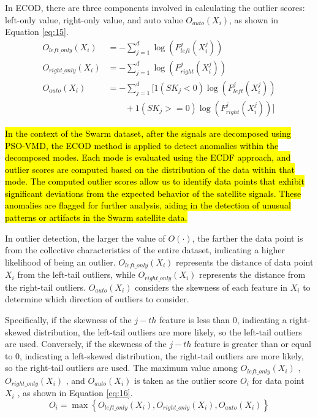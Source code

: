 \documentclass[3p,authoryear,preprint,12pt]{elsarticle}
\begin{document}
In ECOD, there are three components involved in calculating the outlier scores: left-only value, right-only value, and auto value $O_{auto}(X_i)$, as shown in Equation \ref{eq:15}.
\begin{equation}
	\label{eq:15}
	\begin{split}
		O_{left\_only}(X_i) &= - \sum_{j=1}^{d} \log \left( F_{left}^j\left( X_i^j \right) \right) \\
		O_{right\_only}(X_i) &= - \sum_{j=1}^{d} \log \left( F_{right}^j \left( X_i^j \right) \right) \\
		O_{auto}(X_i) &= - \sum_{j=1}^{d} [ 1( SK_j < 0 )\log (F_{left}^j(X_i^j)) \\ & \quad \quad + 1( SK_j >= 0 ) \log (F_{right}^j(X_i^j))]  
	\end{split}
\end{equation}

\hl{In the context of the Swarm dataset, after the signals are decomposed using PSO-VMD, the ECOD method is applied to detect anomalies within the decomposed modes. Each mode is evaluated using the ECDF approach, and outlier scores are computed based on the distribution of the data within that mode. The computed outlier scores allow us to identify data points that exhibit significant deviations from the expected behavior of the satellite signals. These anomalies are flagged for further analysis, aiding in the detection of unusual patterns or artifacts in the Swarm satellite data.}

In outlier detection, the larger the value of $O(\cdot)$, the farther the data point is from the collective characteristics of the entire dataset, indicating a higher likelihood of being an outlier. $O_{left\_only}(X_i)$ represents the distance of data point $X_i$  from the left-tail outliers, while $O_{right\_only}(X_i)$  represents the distance from the right-tail outliers. $O_{auto}(X_i)$ considers the skewness of each feature in $X_i$  to determine which direction of outliers to consider. 

Specifically, if the skewness of the  $j-th$ feature is less than 0, indicating a right-skewed distribution, the left-tail outliers are more likely, so the left-tail outliers are used. Conversely, if the skewness of the  $j-th$ feature is greater than or equal to 0, indicating a left-skewed distribution, the right-tail outliers are more likely, so the right-tail outliers are used. The maximum value among $O_{left\_only}(X_i)$ , $O_{right\_only}(X_i)$ , and $O_{auto}(X_i)$  is taken as the outlier score $O_i$  for data point $X_i$ , as shown in Equation \ref{eq:16}.
\begin{equation}
	\label{eq:16}
	O_i = \max \left\lbrace   O_{left\_only}(X_i), O_{right\_only}(X_i), O_{auto}(X_i)   \right\rbrace 
\end{equation}
\end{document}
